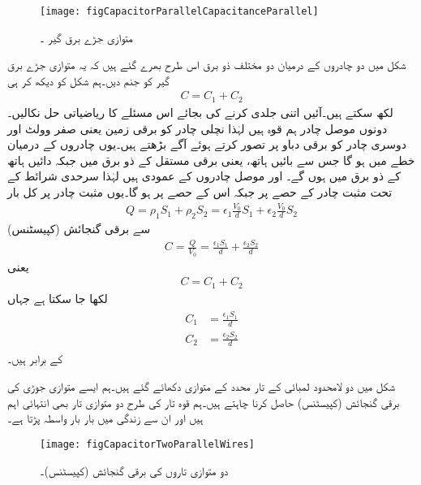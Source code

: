 \begin{figure}[!ht]
\centering
\texttt{[image: figCapacitorParallelCapacitanceParallel]}
\caption{متوازی جڑے برق گیر ۔}
\label{شکل_کپیسٹر_متوازی_جڑے}
\end{figure} 

شکل  میں دو چادروں کے درمیان دو مختلف ذو برق اس طرح بھرے گئے ہیں کہ یہ متوازی جڑے برق گیر کو جنم دیں۔ہم شکل کو دیکھ کر ہی 
\begin{align}
C=C_1+C_2
\end{align}
لکھ سکتے ہیں۔آئیں اتنی جلدی کرنے کی بجائے اس مسئلے کا ریاضیاتی حل نکالیں۔دونوں موصل چادر ہم قوہ ہیں لہٰذا نچلی چادر کو برقی زمین یعنی صفر وولٹ اور دوسری چادر کو  برقی دباو پر تصور کرتے ہوئے آگے بڑھتے ہیں۔یوں چادروں کے درمیان خطے میں  ہو گا جس سے بائیں ہاتھ، یعنی  برقی مستقل کے ذو برق میں  جبکہ دائیں ہاتھ کے ذو برق میں  ہوں گے۔ اور  موصل چادروں کے عمودی ہیں لہٰذا سرحدی شرائط کے تحت مثبت چادر کے  حصے پر  جبکہ اس کے  حصے پر  ہو گا۔یوں مثبت چادر پر کل بار
\begin{align*}
Q=\rho_1 S_1+\rho_2 S_2=\epsilon_1 \frac{V_0}{d} S_1+\epsilon_2 \frac{V_0}{d}S_2
\end{align*}
سے برقی گنجائش (کپیسٹنس)
\begin{align*}
C=\frac{Q}{V_0}=\frac{\epsilon_1 S_1}{d}+\frac{\epsilon_2 S_2}{d}
\end{align*}
یعنی
\begin{align}
C=C_1+C_2
\end{align}
لکھا جا سکتا ہے جہاں
\begin{gather}
\begin{aligned}
C_1&=\frac{\epsilon_1 S_1}{d}\\
C_2&=\frac{\epsilon_2 S_2}{d}
\end{aligned}
\end{gather}
کے برابر ہیں۔

شکل  میں دو لامحدود لمبائی کے تار  محدد کے متوازی دکھائے گئے ہیں۔ہم ایسے متوازی جوڑی کی برقی گنجائش (کپیسٹنس) حاصل کرنا چاہتے ہیں۔ہم قوہ تار کی طرح دو متوازی تار بھی انتہائی اہم ہیں اور ان سے زندگی میں بار بار واسطہ پڑتا ہے۔
\begin{figure}
\centering
\texttt{[image: figCapacitorTwoParallelWires]}
\caption{دو متوازی تاروں کی برقی گنجائش (کپیسٹنس)۔}
\label{شکل_کپیسٹر_متوازی_تار}
\end{figure}

